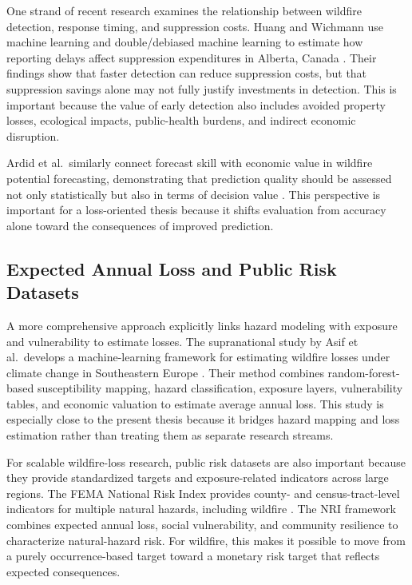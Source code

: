 One strand of recent research examines the relationship between wildfire detection, response timing, and suppression costs. Huang and Wichmann use machine learning and double/debiased machine learning to estimate how reporting delays affect suppression expenditures in Alberta, Canada \citep{huang2024suppression}. Their findings show that faster detection can reduce suppression costs, but that suppression savings alone may not fully justify investments in detection. This is important because the value of early detection also includes avoided property losses, ecological impacts, public-health burdens, and indirect economic disruption.

Ardid et al.\ similarly connect forecast skill with economic value in wildfire potential forecasting, demonstrating that prediction quality should be assessed not only statistically but also in terms of decision value \citep{ardid2026forecastskill}. This perspective is important for a loss-oriented thesis because it shifts evaluation from accuracy alone toward the consequences of improved prediction.

\subsection{Expected Annual Loss and Public Risk Datasets}

A more comprehensive approach explicitly links hazard modeling with exposure and vulnerability to estimate losses. The supranational study by Asif et al.\ develops a machine-learning framework for estimating wildfire losses under climate change in Southeastern Europe \citep{asif2026supranational}. Their method combines random-forest-based susceptibility mapping, hazard classification, exposure layers, vulnerability tables, and economic valuation to estimate average annual loss. This study is especially close to the present thesis because it bridges hazard mapping and loss estimation rather than treating them as separate research streams.

For scalable wildfire-loss research, public risk datasets are also important because they provide standardized targets and exposure-related indicators across large regions. The FEMA National Risk Index provides county- and census-tract-level indicators for multiple natural hazards, including wildfire \citep{fema2025nri_technical,fema2025nri_methodology}. The NRI framework combines expected annual loss, social vulnerability, and community resilience to characterize natural-hazard risk. For wildfire, this makes it possible to move from a purely occurrence-based target toward a monetary risk target that reflects expected consequences.

